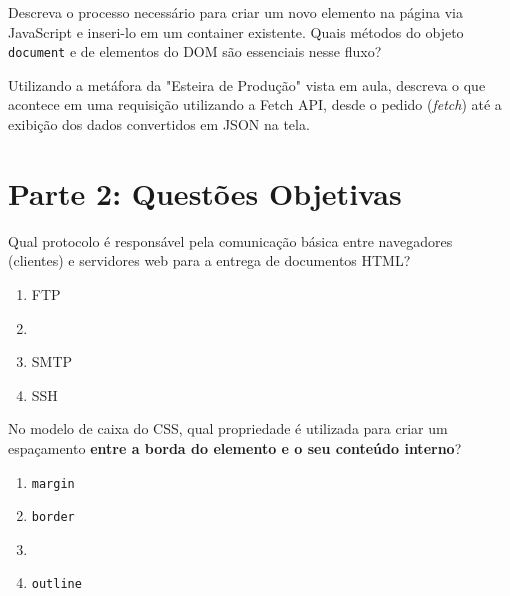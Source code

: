 \documentclass[12pt,a4paper]{article}
\newcommand{\correto}[1]{\iftoggle{gabarito}{\textbf{\color{corGabarito}#1}}{#1}}
\newcommand{\checkGabarito}[1]{\iftoggle{gabarito}{\hspace{0.5cm} \textbf{\color{corGabarito}--- #1}}{}}
\begin{document}
\begin{tcolorbox}[colback=azulTitulo!5, colframe=azulTitulo, title=Questão 2: Manipulação Dinâmica do DOM]
    Descreva o processo necessário para criar um novo elemento na página via JavaScript e inseri-lo em um container existente. Quais métodos do objeto \texttt{document} e de elementos do DOM são essenciais nesse fluxo?
    \vspace{4cm}
    \checkGabarito{Resposta esperada: 1. createElement() para fabricar o elemento; 2. innerText/innerHTML para dar conteúdo; 3. appendChild() ou append() para inserir no container pai.}
\end{tcolorbox}

\begin{tcolorbox}[colback=azulTitulo!5, colframe=azulTitulo, title=Questão 3: Requisições Assíncronas (Fetch API)]
    Utilizando a metáfora da "Esteira de Produção" vista em aula, descreva o que acontece em uma requisição utilizando a Fetch API, desde o pedido (\textit{fetch}) até a exibição dos dados convertidos em JSON na tela.
    \vspace{4cm}
    \checkGabarito{Resposta esperada: O fetch faz o pedido à rede; o primeiro .then() recebe a resposta bruta e converte para JSON (response.json()); o segundo .then() recebe os dados prontos para serem manipulados via DOM.}
\end{tcolorbox}

\newpage

\section*{Parte 2: Questões Objetivas}

\begin{tcolorbox}[colback=white, colframe=azulTitulo, title=Questão 4: Fundamentos da Web]
    Qual protocolo é responsável pela comunicação básica entre navegadores (clientes) e servidores web para a entrega de documentos HTML?
    \begin{enumerate}[label=\alph*)]
        \item FTP
        \item \correto{HTTP / HTTPS}
        \item SMTP
        \item SSH
    \end{enumerate}
\end{tcolorbox}

\begin{tcolorbox}[colback=white, colframe=azulTitulo, title=Questão 5: CSS Box Model]
    No modelo de caixa do CSS, qual propriedade é utilizada para criar um espaçamento \textbf{entre a borda do elemento e o seu conteúdo interno}?
    \begin{enumerate}[label=\alph*)]
        \item \texttt{margin}
        \item \texttt{border}
        \item \correto{\texttt{padding}}
        \item \texttt{outline}
    \end{enumerate}
\end{tcolorbox}
\end{document}
